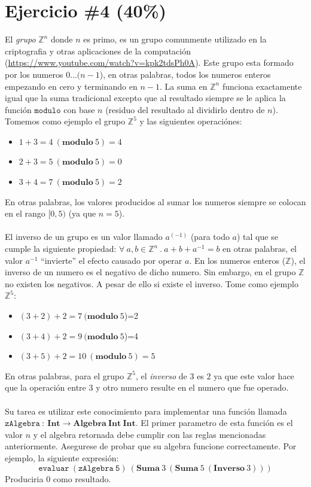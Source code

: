 \documentclass{article}
\begin{document}
\section*{Ejercicio \#4 (40\%)}

El \emph{grupo} $\mathbb{Z}^n$ donde $n$ es primo, es un grupo comunmente utilizado en la criptografia y otras aplicaciones de la computaci\'on
(\url{https://www.youtube.com/watch?v=kpk2tdsPh0A}). Este grupo esta formado por los numeros $0\ldots(n-1$), en otras palabras,
todos los numeros enteros empezando en cero y terminando en $n-1$. La suma en $\mathbb{Z}^n$ funciona exactamente igual que
la suma tradicional excepto que al resultado siempre se le aplica la funci\'on $\mathtt{modulo}$ con base $n$ (residuo del
resultado al dividirlo dentro de $n$). Tomemos como ejemplo el grupo $\mathbb{Z}^5$ y las siguientes operaci\'ones:
\begin{itemize}
        \item{$1+3=4\ (\mathbf{modulo}\ 5)=4$}
        \item{$2+3=5\ (\mathbf{modulo}\ 5)=0$}
        \item{$3+4=7\ (\mathbf{modulo}\ 5)=2$}
\end{itemize}

En otras palabras, los valores producidos al sumar los numeros siempre se colocan en el rango $[0,5)$ (ya que $n=5$).
\\\\
El inverso de un grupo es un valor llamado $a^(-1)$ (para todo $a$) tal que se cumple la siguiente propiedad:
$\forall\ a,b\in\mathbb{Z}^n\ .\ a+b+a^{-1}=b$ en otras palabras, el valor $a^{-1}$ ``invierte'' el efecto causado
por operar $a$. En los numeros enteros ($\mathbb{Z}$), el inverso de un numero es el negativo de dicho numero. Sin
embargo, en el grupo $\mathbb{Z}$ no existen los negativos. A pesar de ello si existe el inverso. Tome como ejemplo $\mathbb{Z}^5$:
\begin{itemize}
        \item{$(3+2)+2=7\ (\mathbf{modulo}\ 5$)=2}
        \item{$(3+4)+2=9\ (\mathbf{modulo}\ 5$)=4}
        \item{$(3+5)+2=10\ (\mathbf{modulo}\ 5)=5$}
\end{itemize}

En otras palabras, para el grupo $\mathbb{Z}^5$, el \emph{inverso} de $3$ es $2$ ya que este valor hace que la operaci\'on
entre $3$ y otro numero resulte en el numero que fue operado.
\\\\
Su tarea es utilizar este conocimiento para implementar una funci\'on llamada $\mathtt{zAlgebra}\ :\ 
\mathbf{Int}\rightarrow\mathbf{Algebra\ Int\ Int}$. El primer parametro de esta funci\'on es el valor $n$
y el algebra retornada debe cumplir con las reglas mencionadas anteriormente. Asegurese de probar que su algebra
funcione correctamente. Por ejemplo, la siguiente expresi\'on:
\[
        \mathtt{evaluar\ (zAlgebra\ 5)}\ (\mathbf{Suma}\ 3\ (\mathbf{Suma}\ 5\ (\mathbf{Inverso}\ 3)))        
\]
Produciria $0$ como resultado.
\end{document}
